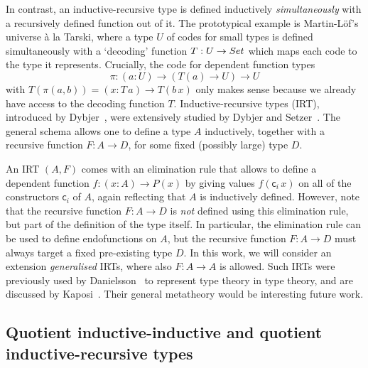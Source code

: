 \documentclass[a4paper,UKenglish,numberwithinsect,cleveref,thm-restate]{lipics-v2021}
\newcommand{\LT}[2][]{\todo[inline,author={L-T},caption={},color={pink},#1]{#2}}
\begin{document}
In contrast, an inductive-recursive type is defined inductively \emph{simultaneously} with a recursively defined function out of it. The prototypical example is Martin-L\"of's universe \`a la Tarski, where a type $U$ of codes for small types is defined simultaneously with a `decoding' function $T : U \to \Set$ which maps each code to the type it represents. Crucially, the code for dependent function types
\[
  \pi : (a : U) \to (T(a) \to U) \to U
\]
with $T(\pi(a, b)) = (x : T\,a) \to T(b\, x)$ only makes sense because we already have access to the decoding function $T$.
%
Inductive-recursive types (IRT), introduced by Dybjer~\cite{Dybjer2000}, were extensively studied by Dybjer and Setzer~\cite{Dybjer1999,Dybjer2003}.
The general schema allows one to define a type $A$ inductively, together with a recursive function $F : A \to D$, for some fixed (possibly large) type $D$.

An IRT $(A, F)$ comes with an elimination rule that allows to define a dependent function  $f : (x : A) \to P(x)$ by giving values $f(\mathsf{c}_i\,x)$ on all of the constructors $\mathsf{c}_i$ of $A$, again reflecting that $A$ is inductively defined.
%
However, note that the recursive function $F : A \to D$ is \emph{not} defined using this elimination rule, but part of the definition of the type itself.
%
In particular, the elimination rule can be used to define endofunctions on $A$, but the recursive function  $F : A \to D$ must always target a fixed pre-existing type $D$.
%
In this work, we will consider an extension \emph{generalised} IRTs, where also $F : A \to A$ is allowed.
%
Such IRTs were previously used by Danielsson~\cite{Danielsson2006} to represent type theory in type theory, and are discussed by Kaposi~\cite{Kaposi2023}.
%
Their general metatheory would be interesting future work.



\subsection{Quotient inductive-inductive and quotient inductive-recursive types}
\end{document}
